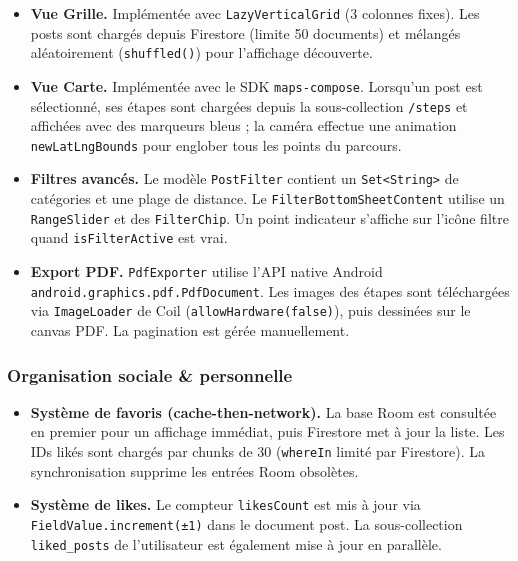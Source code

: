 \documentclass[a4paper, 12pt]{article}
\begin{document}
\begin{justify}
\begin{itemize}

    \item \textbf{Vue Grille.}
    Implémentée avec \texttt{LazyVerticalGrid} (3 colonnes fixes). Les posts sont chargés depuis Firestore (limite 50 documents) et mélangés aléatoirement (\texttt{shuffled()}) pour l'affichage découverte.

    \item \textbf{Vue Carte.}
    Implémentée avec le SDK \texttt{maps-compose}. Lorsqu'un post est sélectionné, ses étapes sont chargées depuis la sous-collection \texttt{/\allowbreak{}steps} et affichées avec des marqueurs bleus ; la caméra effectue une animation \texttt{newLatLngBounds} pour englober tous les points du parcours.

    \item \textbf{Filtres avancés.}
    Le modèle \texttt{PostFilter} contient un \texttt{Set<String>} de catégories et une plage de distance. Le \texttt{FilterBottomSheetContent} utilise un \texttt{RangeSlider} et des \texttt{FilterChip}. Un point indicateur s'affiche sur l'icône filtre quand \texttt{isFilterActive} est vrai.

    \item \textbf{Export PDF.}
    \texttt{PdfExporter} utilise l'API native Android \texttt{android.\allowbreak{}graphics.\allowbreak{}pdf.\allowbreak{}PdfDocument}. Les images des étapes sont téléchargées via \texttt{ImageLoader} de Coil (\texttt{allowHardware(false)}), puis dessinées sur le canvas PDF. La pagination est gérée manuellement.

\end{itemize}

\subsubsection*{Organisation sociale \& personnelle}

\begin{itemize}

    \item \textbf{Système de favoris (cache-then-network).}
    La base Room est consultée en premier pour un affichage immédiat, puis Firestore met à jour la liste. Les IDs likés sont chargés par chunks de 30 (\texttt{whereIn} limité par Firestore). La synchronisation supprime les entrées Room obsolètes.

    \item \textbf{Système de likes.}
    Le compteur \texttt{likesCount} est mis à jour via \texttt{FieldValue.\allowbreak{}increment(±1)} dans le document post. La sous-collection \texttt{liked\_posts} de l'utilisateur est également mise à jour en parallèle.


\end{itemize}
\end{justify}
\end{document}
